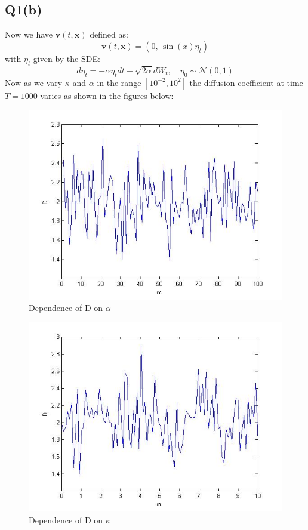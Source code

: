 \documentclass[11pt]{article} %
\begin{document}
\subsection{Q1(b)}
Now we have  $\mathbf{v}(t,\mathbf{x})$ defined as:
\[
	\mathbf{v}(t,\mathbf{x}) = (0,\, \sin(x)\eta_{t})
\]
with $\eta_{t}$ given by the SDE:
\[
	d\eta_{t} = -\alpha\eta_{t}dt + \sqrt{2\alpha}dW_{t}, \quad \eta_{0} \sim \mathcal{N}(0,1)
\]
Now as we vary $\kappa$ and $\alpha$ in the range $[10^{-2}, 10^{2}]$ the diffusion coefficient at time $T = 1000$ varies as shown in the figures below:
\begin{figure}
	\centering
		\includegraphics[scale = 0.5]{q1b_alpha}
		\caption{Dependence of D on $\alpha$}
\end{figure}

\begin{figure}
	\centering
		\includegraphics[scale = 0.5]{q1b_kappa}
		\caption{Dependence of D on $\kappa$}
\end{figure}
\end{document}
